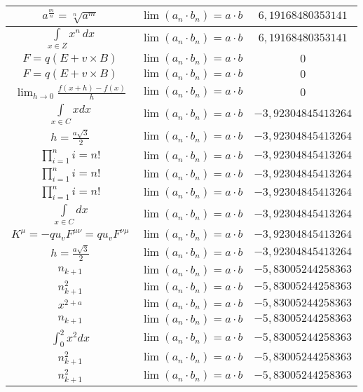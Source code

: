 \documentclass{article}
\begin{document}
\begin{flushleft}
\begin{longtable}{|c|c|c|}
$a^{\frac{m}{n}}=\sqrt[n]{a^{m}}$ & $\lim\left(a_n\cdot b_n\right)=a\cdot b$ & $6,19168480353141$ \\ \hline 
$\int \limits_{x\in Z}\!x^{n}\,dx$ & $\lim\left(a_n\cdot b_n\right)=a\cdot b$ & $6,19168480353141$ \\ \hline 
$F=q\left(E+v\times B\right)$ & $\lim\left(a_n\cdot b_n\right)=a\cdot b$ & $0$ \\ \hline 
$F=q\left(E+v\times B\right)$ & $\lim\left(a_n\cdot b_n\right)=a\cdot b$ & $0$ \\ \hline 
$\lim_{h\to0}\frac{f(x+h)-f(x)}{h}$ & $\lim\left(a_n\cdot b_n\right)=a\cdot b$ & $0$ \\ \hline 
$\int \limits_{x\in C}xdx$ & $\lim\left(a_n\cdot b_n\right)=a\cdot b$ & $-3,92304845413264$ \\ \hline 
$h=\frac{a\sqrt{3}}{2}$ & $\lim\left(a_n\cdot b_n\right)=a\cdot b$ & $-3,92304845413264$ \\ \hline 
$\prod_{i=1}^ni=n!$ & $\lim\left(a_n\cdot b_n\right)=a\cdot b$ & $-3,92304845413264$ \\ \hline 
$\prod_{i=1}^ni=n!$ & $\lim\left(a_n\cdot b_n\right)=a\cdot b$ & $-3,92304845413264$ \\ \hline 
$\prod_{i=1}^ni=n!$ & $\lim\left(a_n\cdot b_n\right)=a\cdot b$ & $-3,92304845413264$ \\ \hline 
$\int \limits_{x\in C}dx$ & $\lim\left(a_n\cdot b_n\right)=a\cdot b$ & $-3,92304845413264$ \\ \hline 
$K^\mu=-qu_vF^{\mu\nu}=qu_vF^{\nu\mu}$ & $\lim\left(a_n\cdot b_n\right)=a\cdot b$ & $-3,92304845413264$ \\ \hline 
$h=\frac{a\sqrt{3}}{2}$ & $\lim\left(a_n\cdot b_n\right)=a\cdot b$ & $-3,92304845413264$ \\ \hline 
$n_{k+1}$ & $\lim\left(a_n\cdot b_n\right)=a\cdot b$ & $-5,83005244258363$ \\ \hline 
$n_{k+1}^2$ & $\lim\left(a_n\cdot b_n\right)=a\cdot b$ & $-5,83005244258363$ \\ \hline 
$x^{2+a}$ & $\lim\left(a_n\cdot b_n\right)=a\cdot b$ & $-5,83005244258363$ \\ \hline 
$n_{k+1}$ & $\lim\left(a_n\cdot b_n\right)=a\cdot b$ & $-5,83005244258363$ \\ \hline 
$\int _0^2x^2dx$ & $\lim\left(a_n\cdot b_n\right)=a\cdot b$ & $-5,83005244258363$ \\ \hline 
$n_{k+1}^2$ & $\lim\left(a_n\cdot b_n\right)=a\cdot b$ & $-5,83005244258363$ \\ \hline 
$n_{k+1}^2$ & $\lim\left(a_n\cdot b_n\right)=a\cdot b$ & $-5,83005244258363$ \\ \hline 

\end{longtable}
\end{flushleft}
\end{document}
